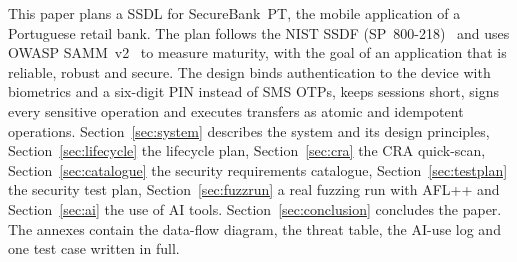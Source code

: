 This paper plans a \ac{SSDL} for SecureBank~PT, the mobile application of a
Portuguese retail bank. The plan follows the NIST \ac{SSDF}
(SP~800-218)~\cite{nist800218} and uses OWASP \ac{SAMM}~v2~\cite{samm} to
measure maturity, with the goal of an application that is reliable,
robust and secure. The design binds authentication to the device with
biometrics and a six-digit \ac{PIN} instead of SMS \acp{OTP}, keeps
sessions short, signs every sensitive operation and executes transfers
as atomic and idempotent operations. Section~\ref{sec:system} describes
the system and its design principles, Section~\ref{sec:lifecycle} the
lifecycle plan, Section~\ref{sec:cra} the \ac{CRA} quick-scan,
Section~\ref{sec:catalogue} the security requirements catalogue,
Section~\ref{sec:testplan} the security test plan,
Section~\ref{sec:fuzzrun} a real fuzzing run with AFL++ and
Section~\ref{sec:ai} the use of AI tools. Section~\ref{sec:conclusion}
concludes the paper. The annexes contain the data-flow diagram, the
threat table, the AI-use log and one test case written in full.
